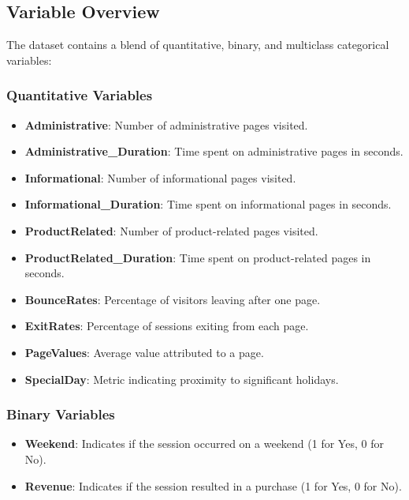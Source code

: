 \documentclass[a4paper, 12pt]{article}
\begin{document}
\subsection{Variable Overview}
The dataset contains a blend of quantitative, binary, and multiclass categorical variables:

\subsubsection{Quantitative Variables}
\begin{itemize}
    \item \textbf{Administrative}: Number of administrative pages visited.
    \item \textbf{Administrative\_Duration}: Time spent on administrative pages in seconds.
    \item \textbf{Informational}: Number of informational pages visited.
    \item \textbf{Informational\_Duration}: Time spent on informational pages in seconds.
    \item \textbf{ProductRelated}: Number of product-related pages visited.
    \item \textbf{ProductRelated\_Duration}: Time spent on product-related pages in seconds.
    \item \textbf{BounceRates}: Percentage of visitors leaving after one page.
    \item \textbf{ExitRates}: Percentage of sessions exiting from each page.
    \item \textbf{PageValues}: Average value attributed to a page.
    \item \textbf{SpecialDay}: Metric indicating proximity to significant holidays.
\end{itemize}

\subsubsection{Binary Variables}
\begin{itemize}
    \item \textbf{Weekend}: Indicates if the session occurred on a weekend (1 for Yes, 0 for No).
    \item \textbf{Revenue}: Indicates if the session resulted in a purchase (1 for Yes, 0 for No).
\end{itemize}
\end{document}
